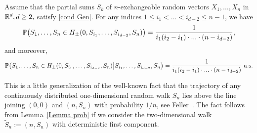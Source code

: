 \documentclass[12pt, reqno]{amsart}
\begin{document}
\begin{lem}\label{Lemma prob}
Assume that the partial sums $S_k$ of $n$-exchangeable random vectors $X_1, \dots, X_n$ in $ \R^d, d \ge 2,$ satisfy \eqref{cond Gen}. For any indices $1 \le i_1 < \dots < i_{d-2} \le n-1$, we have
$$\P \bigl(S_1, \dots, S_n \in H_\pm(0, S_{i_1}, \dots, S_{i_{d-2}}, S_n) \bigr) = \frac{1}{i_1 (i_2-i_1) \cdot ... \cdot (n -i_{d-2})},$$ and moreover,
$$\P \bigl(S_1, \dots, S_n \in H_\pm(0, S_{i_1}, \dots, S_{i_{d-2}}, S_n) \bigl| \bigr. S_{i_1}, \dots, S_{i_{d-2}}, S_n \bigr) = \frac{1}{i_1 (i_2-i_1) \cdot ... \cdot (n -i_{d-2})} \text{ a.s.}$$
\end{lem}

This is a little generalization of the well-known fact that the trajectory of any continuously distributed one-dimensional random walk $S_n$ lies above the line joining $(0,0)$ and $(n, S_n)$ with probability $1/n$, see Feller~\cite[Sec. XII.9]{Feller}. The fact follows from Lemma~\ref{Lemma prob} if we consider the two-dimensional walk $\tilde{S}_n:=(n, S_n)$ with deterministic first component.
\end{document}

